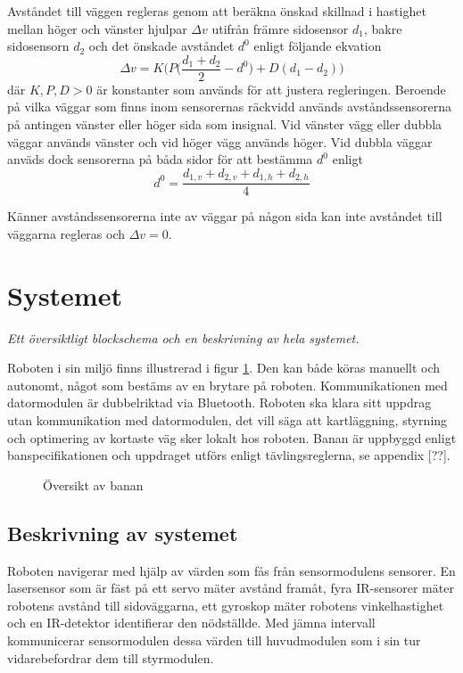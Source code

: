 \documentclass[11pt]{article}
\begin{document}
\begin{flushleft}
Avståndet till väggen regleras genom att beräkna önskad skillnad i hastighet mellan höger och vänster hjulpar $\Delta v$ utifrån främre sidosensor $d_1$, bakre sidosensorn $d_2$ och det önskade avståndet $d^0$ enligt följande ekvation
\begin{equation*}
	\Delta v = K \Bigg( P \Big( \frac {d_1 + d_2} {2} - d^0 \Big) + D (d_1 - d_2) \Bigg)
\end{equation*}
där $K, P, D > 0$ är konstanter som används för att justera regleringen. Beroende på vilka väggar som finns inom sensorernas räckvidd används avståndssensorerna på antingen vänster eller höger sida som insignal. Vid vänster vägg eller dubbla väggar används vänster och vid höger vägg används höger. Vid dubbla väggar anväds dock sensorerna på båda sidor för att bestämma  $d^0$ enligt
\begin{equation*}
	d^0 = \frac {d_{1,v} + d_{2,v} + d_{1,h} + d_{2,h}} {4}
\end{equation*}

Känner avståndssensorerna inte av väggar på någon sida kan inte avståndet till väggarna regleras och $\Delta v = 0$.

\pagebreak

\section{Systemet}
\textit{Ett översiktligt blockschema och en beskrivning av hela systemet.}

Roboten i sin miljö finns illustrerad i figur \ref{system}. Den kan både köras manuellt och autonomt, något som bestäms av en brytare på roboten. Kommunikationen med datormodulen är dubbelriktad via Bluetooth\textsuperscript{\circledR}. Roboten ska klara sitt uppdrag utan kommunikation med datormodulen, det vill säga att kartläggning, styrning och optimering av kortaste väg sker lokalt hos roboten. Banan är uppbyggd enligt banspecifikationen och uppdraget utförs enligt tävlingsreglerna, se appendix [??].

\begin{figure}[htbp]
\centering
\noindent\resizebox{.8\linewidth}{!}{
	}
	\caption{Översikt av banan\label{system}}	
\end{figure}

\subsection{Beskrivning av systemet}

Roboten navigerar med hjälp av värden som fås från sensormodulens sensorer. En lasersensor som är fäst på ett servo mäter avstånd framåt, fyra IR-sensorer mäter robotens avstånd till sidoväggarna, ett gyroskop mäter robotens vinkelhastighet och en IR-detektor identifierar den nödställde. Med jämna intervall kommunicerar sensormodulen dessa värden till huvudmodulen som i sin tur vidarebefordrar dem till styrmodulen. 



\end{flushleft}
\end{document}
